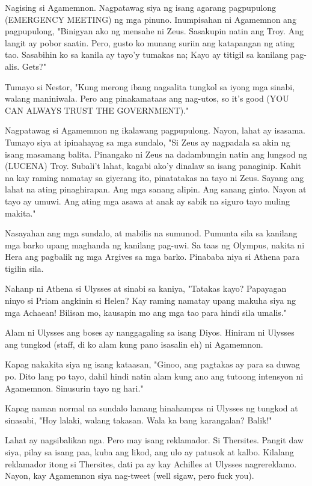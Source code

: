 \documentclass[12pt,letterpaper]{report}
\begin{document}
Nagising si Agamemnon. Nagpatawag siya ng isang agarang pagpupulong (EMERGENCY MEETING) ng mga pinuno.
Inumpisahan ni Agamemnon ang pagpupulong, "Binigyan ako ng mensahe ni Zeus. Sasakupin natin ang Troy.
Ang langit ay pobor saatin. Pero, gusto ko munang suriin ang katapangan ng ating tao.
Sasabihin ko sa kanila ay tayo'y tumakas na; Kayo ay titigil sa kanilang pag-alis. Gets?"

Tumayo si Nestor, "Kung merong ibang nagsalita tungkol sa iyong mga sinabi, walang maniniwala.
Pero ang pinakamataas ang nag-utos, so it's good (YOU CAN ALWAYS TRUST THE GOVERNMENT)."

Nagpatawag si Agamemnon ng ikalawang pagpupulong. Nayon, lahat ay isasama.
Tumayo siya at ipinahayag sa mga sundalo, "Si Zeus ay nagpadala sa akin ng isang masamang balita.
Pinangako ni Zeus na dadambungin natin ang lungsod ng (LUCENA) Troy. Subali't lahat, kagabi ako'y dinalaw sa isang panaginip.
Kahit na kay raming namatay sa giyerang ito, pinatatakas na tayo ni Zeus. Sayang ang lahat na ating pinaghirapan.
Ang mga sanang alipin. Ang sanang ginto. Nayon at tayo ay umuwi. Ang ating mga asawa at anak ay sabik na siguro tayo muling makita."

Nasayahan ang mga sundalo, at mabilis na sumunod. Pumunta sila sa kanilang mga barko upang maghanda ng kanilang pag-uwi.
Sa taas ng Olympus, nakita ni Hera ang pagbalik ng mga Argives sa mga barko. Pinababa niya si Athena para tigilin sila.

Nahanp ni Athena si Ulysses at sinabi sa kaniya, "Tatakas kayo? Papayagan ninyo si Priam angkinin si Helen?
Kay raming namatay upang makuha siya ng mga Achaean! Bilisan mo, kausapin mo ang mga tao para hindi sila umalis."

Alam ni Ulysses ang boses ay nanggagaling sa isang Diyos.
Hiniram ni Ulysses ang tungkod (staff, di ko alam kung pano isasalin eh) ni Agamemnon.

Kapag nakakita siya ng isang kataasan, "Ginoo, ang pagtakas ay para sa duwag po. Dito lang po tayo,
dahil hindi natin alam kung ano ang tutoong intensyon ni Agamemnon. Sinusurin tayo ng hari."

Kapag naman normal na sundalo lamang hinahampas ni Ulysses ng tungkod at sinasabi, "Hoy lalaki, walang takasan.
Wala ka bang karangalan? Balik!"

Lahat ay nagsibalikan nga. Pero may isang reklamador. Si Thersites. Pangit daw siya, pilay sa isang paa,
kuba ang likod, ang ulo ay patusok at kalbo. Kilalang reklamador itong si Thersites,
dati pa ay kay Achilles at Ulysses nagrereklamo. Nayon, kay Agamemnon siya nag-tweet (well sigaw, pero fuck you).
\end{document}
